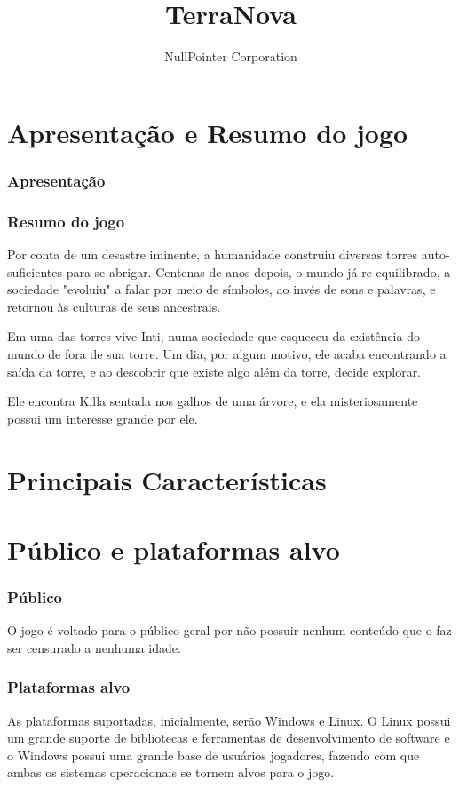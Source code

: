 \documentclass[11pt]{article}
\begin{document}
\title{TerraNova}
\author{NullPointer Corporation}
\date{}
\maketitle

\newpage

\tableofcontents
\newpage
\part{Apresentação e Resumo do jogo}
\section{Apresentação}

\section{Resumo do jogo}
Por conta de um desastre iminente, a humanidade construiu diversas torres auto-suficientes para se abrigar.
Centenas de anos depois, o mundo já re-equilibrado, a sociedade "evoluiu" a falar por meio de símbolos, ao invés de sons e palavras, e retornou às culturas de seus ancestrais.

Em uma das torres vive Inti, numa sociedade que esqueceu da existência do mundo de fora de sua torre.
Um dia, por algum motivo, ele acaba encontrando a saída da torre, e ao descobrir que existe algo além da torre, decide explorar.

Ele encontra Killa sentada nos galhos de uma árvore, e ela misteriosamente possui um interesse grande por ele.
\newpage
\part{Principais Características}
\newpage
\part{Público e plataformas alvo}
\section{Público}
O jogo é voltado para o público geral por não possuir nenhum conteúdo que o faz ser censurado a nenhuma idade.
\section{Plataformas alvo}
As plataformas suportadas, inicialmente, serão Windows e Linux.
O Linux possui um grande suporte de bibliotecas e ferramentas de desenvolvimento de software e o Windows possui uma grande base de usuários jogadores, fazendo com que ambas os sistemas operacionais se tornem alvos para o jogo.
\newpage
\end{document}
